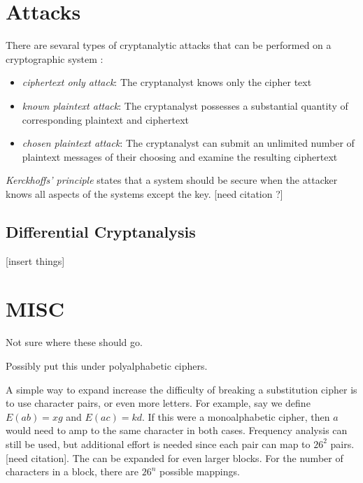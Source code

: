 \documentclass[12pt]{article}
\begin{document}
\section{Attacks}

There are sevaral types of cryptanalytic attacks that can be performed on a cryptographic system \cite{diffiehellman}:
\begin{itemize}
	\item{\textit{ciphertext only attack}: The cryptanalyst knows only the cipher text}
	\item{\textit{known plaintext attack}: The cryptanalyst possesses a substantial quantity of corresponding plaintext and ciphertext}
	\item{\textit{chosen plaintext attack}: The cryptanalyst can submit an unlimited number of plaintext messages of their choosing and examine the resulting ciphertext}
\end{itemize}

\textit{Kerckhoffs' principle} states that a system should be secure when the attacker knows all aspects of the systems except the key. [need citation ?]
\subsection{Differential Cryptanalysis}

[insert things]

\section{MISC}
Not sure where these should go.

Possibly put this under polyalphabetic ciphers.

A simple way to expand increase the difficulty of breaking a substitution cipher is to use character pairs, or even more letters. For example, say we define $E(ab)=xg$ and $E(ac)=kd$. If this were a monoalphabetic cipher, then $a$ would need to amp to the same character in both cases. Frequency analysis can still be used, but additional effort is needed since each pair can map to $26^2$ pairs. [need citation]. The can be expanded for even larger blocks. For the number of characters in a block, there are $26^n$ possible mappings.

\newpage

\end{document}
